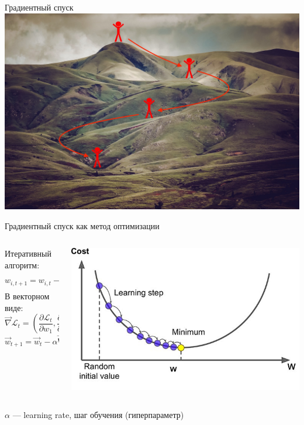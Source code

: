 \documentclass[aspectratio=169]{beamer}
\begin{document}
\begin{frame}{Градиентный спуск}
    \centering
	\includegraphics[width=.7\linewidth]{graphs/fig4.jpg}
\end{frame}

\begin{frame}{Градиентный спуск как метод оптимизации}
		\begin{columns}
			\begin{column}{.35\linewidth}
                Итеративный алгоритм:
                \[ w_{i, t+1} = w_{i, t} - \alpha \frac{\partial \mathcal{L}_t}{\partial w_i} \]
                В векторном виде:
                \[
                    \vec{\nabla} \mathcal{L}_t = \left(
                    \frac{\partial \mathcal{L}_t}{\partial w_1},
                    \frac{\partial \mathcal{L}_t}{\partial w_2},
                    \cdots
                    \right)
                \]
                \[ \vec{w}_{t+1} = \vec{w}_t - \alpha \vec{\nabla} \mathcal{L}_t \]
			\end{column}
			\begin{column}{.6\linewidth}
				\centering
				\includegraphics[width=\linewidth]{graphs/fig5.jpg}
			\end{column}
		\end{columns}
	\centering
	\(\alpha\) --- learning rate, шаг обучения (гиперпараметр)
\end{frame}
\end{document}
